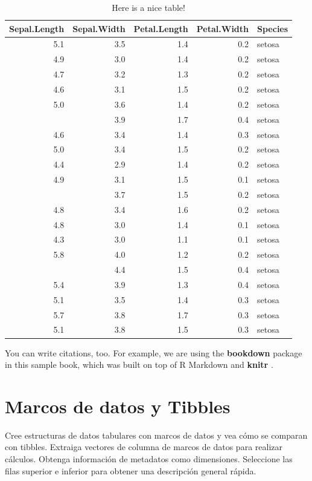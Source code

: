 \documentclass[
]{book}
\begin{document}
\begin{table}

\caption{\label{tab:nice-tab}Here is a nice table!}
\centering
\begin{tabular}[t]{rrrrl}
\toprule
Sepal.Length & Sepal.Width & Petal.Length & Petal.Width & Species\\
\midrule
5.1 & 3.5 & 1.4 & 0.2 & setosa\\
4.9 & 3.0 & 1.4 & 0.2 & setosa\\
4.7 & 3.2 & 1.3 & 0.2 & setosa\\
4.6 & 3.1 & 1.5 & 0.2 & setosa\\
5.0 & 3.6 & 1.4 & 0.2 & setosa\\
\addlinespace
5.4 & 3.9 & 1.7 & 0.4 & setosa\\
4.6 & 3.4 & 1.4 & 0.3 & setosa\\
5.0 & 3.4 & 1.5 & 0.2 & setosa\\
4.4 & 2.9 & 1.4 & 0.2 & setosa\\
4.9 & 3.1 & 1.5 & 0.1 & setosa\\
\addlinespace
5.4 & 3.7 & 1.5 & 0.2 & setosa\\
4.8 & 3.4 & 1.6 & 0.2 & setosa\\
4.8 & 3.0 & 1.4 & 0.1 & setosa\\
4.3 & 3.0 & 1.1 & 0.1 & setosa\\
5.8 & 4.0 & 1.2 & 0.2 & setosa\\
\addlinespace
5.7 & 4.4 & 1.5 & 0.4 & setosa\\
5.4 & 3.9 & 1.3 & 0.4 & setosa\\
5.1 & 3.5 & 1.4 & 0.3 & setosa\\
5.7 & 3.8 & 1.7 & 0.3 & setosa\\
5.1 & 3.8 & 1.5 & 0.3 & setosa\\
\bottomrule
\end{tabular}
\end{table}

You can write citations, too. For example, we are using the \textbf{bookdown} package \citep{R-bookdown} in this sample book, which was built on top of R Markdown and \textbf{knitr} \citep{xie2015}.

\hypertarget{marcos-de-datos-y-tibbles}{%
\chapter{Marcos de datos y Tibbles}\label{marcos-de-datos-y-tibbles}}

Cree estructuras de datos tabulares con marcos de datos y vea cómo se comparan con tibbles. Extraiga vectores de columna de marcos de datos para realizar cálculos. Obtenga información de metadatos como dimensiones. Seleccione las filas superior e inferior para obtener una descripción general rápida.
\end{document}
